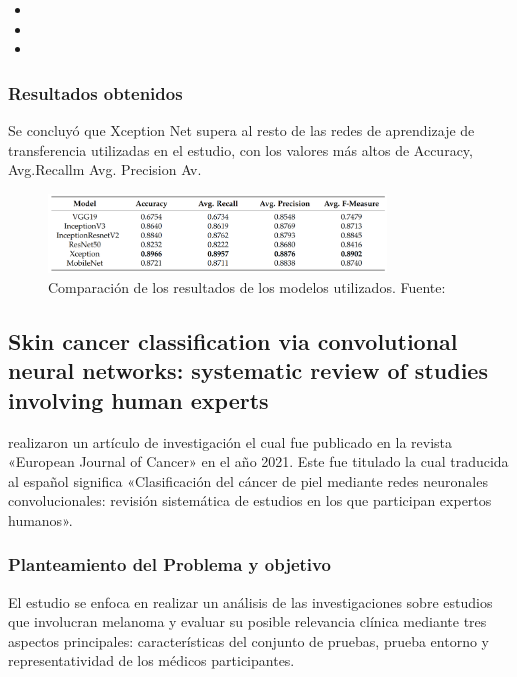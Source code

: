 \begin{itemize}
	\item \TIDLone
	\item \TIDLtwo
	\item \TIDLthree
\end{itemize}


\subsubsection{Resultados obtenidos}
Se concluyó que Xception Net supera al resto de las redes de aprendizaje de transferencia utilizadas en el estudio, con los valores más altos de Accuracy, Avg.Recallm Avg. Precision Av.

\begin{figure}[h]
	\begin{center}
		\includegraphics[width=0.8\textwidth]{2/figuras/Deep_Learning_Based_Transfer_Learning_imagen_01.png}
		\caption{Comparación de los resultados de los modelos utilizados. Fuente: \cite{jain2021deep}}
		\label{1:fig}
	\end{center}
\end{figure}






\subsection{Skin cancer classification via convolutional neural networks: systematic review of studies involving human experts \citep*{haggenmuller2021skin}}
\citeauthor{haggenmuller2021skin} realizaron un artículo de investigación el cual fue publicado en la revista «European Journal of Cancer» en el año 2021. Este fue titulado  la cual traducida al español significa «Clasificación del cáncer de piel mediante redes neuronales convolucionales: revisión sistemática de estudios en los que participan expertos humanos».

\subsubsection{Planteamiento del Problema y objetivo}
El estudio se enfoca en realizar un análisis de las investigaciones sobre estudios que involucran melanoma y evaluar su posible relevancia clínica mediante tres aspectos principales: características del conjunto de pruebas, prueba entorno y representatividad de los médicos participantes.

